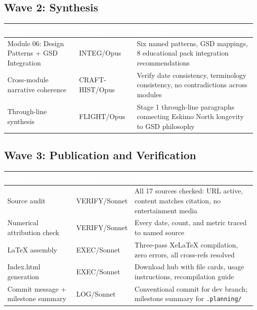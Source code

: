\documentclass[11pt,letterpaper]{article}
\newcommand{\tableheader}[1]{\textbf{\sffamily\textcolor{white}{#1}}}
\begin{document}
\subsection{Wave 2: Synthesis}

\begin{center}
\begin{tabularx}{\textwidth}{L{3cm}L{2.5cm}X}
\toprule
{}
\tableheader{Task} & \tableheader{Agent} & \tableheader{Output} \\
\midrule
Module 06: Design Patterns + GSD Integration & INTEG/Opus & Six named patterns, GSD mappings, 8 educational pack integration recommendations \\
Cross-module narrative coherence & CRAFT-HIST/Opus & Verify date consistency, terminology consistency, no contradictions across modules \\
Through-line synthesis & FLIGHT/Opus & Stage 1 through-line paragraphs connecting Eskimo North longevity to GSD philosophy \\
\bottomrule
\end{tabularx}
\end{center}

\subsection{Wave 3: Publication and Verification}

\begin{center}
\begin{tabularx}{\textwidth}{L{3cm}L{2.5cm}X}
\toprule
{}
\tableheader{Task} & \tableheader{Agent} & \tableheader{Output} \\
\midrule
Source audit & VERIFY/Sonnet & All 17 sources checked: URL active, content matches citation, no entertainment media \\
Numerical attribution check & VERIFY/Sonnet & Every date, count, and metric traced to named source \\
LaTeX assembly & EXEC/Sonnet & Three-pass XeLaTeX compilation, zero errors, all cross-refs resolved \\
Index.html generation & EXEC/Sonnet & Download hub with file cards, usage instructions, recompilation guide \\
Commit message + milestone summary & LOG/Sonnet & Conventional commit for dev branch; milestone summary for \texttt{.planning/} \\
\bottomrule
\end{tabularx}
\end{center}
\end{document}
